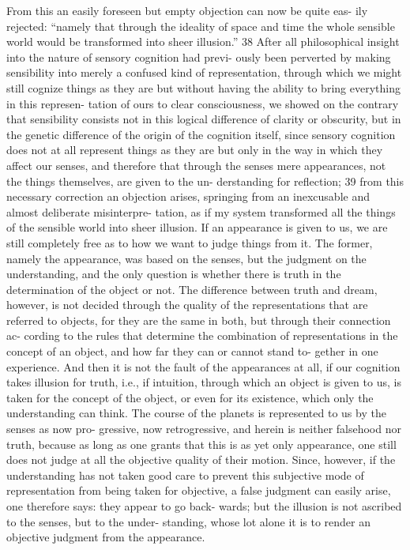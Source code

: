 From this an easily foreseen but empty objection can now be quite eas-
ily rejected: “namely that through the ideality of space and time the
whole sensible world would be transformed into sheer illusion.” 38 After
all philosophical insight into the nature of sensory cognition had previ-
ously been perverted by making sensibility into merely a confused kind
of representation, through which we might still cognize things as they
are but without having the ability to bring everything in this represen-
tation of ours to clear consciousness, we showed on the contrary that
sensibility consists not in this logical difference of clarity or obscurity,
but in the genetic difference of the origin of the cognition itself, since
sensory cognition does not at all represent things as they are but only in
the way in which they affect our senses, and therefore that through the
senses mere appearances, not the things themselves, are given to the un-
derstanding for reﬂection; 39 from this necessary correction an objection
arises, springing from an inexcusable and almost deliberate misinterpre-
tation, as if my system transformed all the things of the sensible world
into sheer illusion.
If an appearance is given to us, we are still completely free as to how
we want to judge things from it. The former, namely the appearance,
was based on the senses, but the judgment on the understanding, and
the only question is whether there is truth in the determination of the
object or not. The difference between truth and dream, however, is not
decided through the quality of the representations that are referred to
objects, for they are the same in both, but through their connection ac-
cording to the rules that determine the combination of representations
in the concept of an object, and how far they can or cannot stand to-
gether in one experience. And then it is not the fault of the appearances
at all, if our cognition takes illusion for truth, i.e., if intuition, through
which an object is given to us, is taken for the concept of the object,
or even for its existence, which only the understanding can think. The
course of the planets is represented to us by the senses as now pro-
gressive, now retrogressive, and herein is neither falsehood nor truth,
because as long as one grants that this is as yet only appearance, one
still does not judge at all the objective quality of their motion. Since,
however, if the understanding has not taken good care to prevent this
subjective mode of representation from being taken for objective, a false
judgment can easily arise, one therefore says: they appear to go back-
wards; but the illusion is not ascribed to the senses, but to the under-
standing, whose lot alone it is to render an objective judgment from the
appearance.

